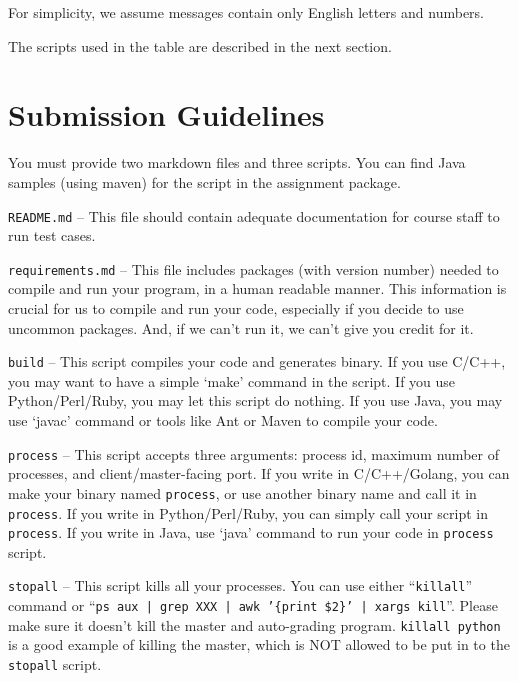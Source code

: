 \documentclass[11pt]{article}
\begin{document}
    For simplicity, we assume messages contain only English letters and numbers.

    The scripts used in the table are described in the next section.

    \section{Submission Guidelines}\label{sec:submissionGuidelines}
    \begin{compactitem}
        \item You must provide two markdown files and three scripts.
        You can find Java samples (using maven) for the script in the assignment package.
        \begin{compactitem}
            \item \texttt{README.md} -- This file should contain adequate documentation for course staff to run test cases.

            \item \texttt{requirements.md} -- This file includes packages (with version number) needed to compile and run your program, in a human readable manner.
            This information is crucial for us to compile and run your code, especially if you decide to use uncommon packages.
            And, if we can't run it, we can't give you credit for it.

            \item \texttt{build} -- This script compiles your code and generates binary.
            If you use C/C++, you may want to have a simple `make' command in the script.
            If you use Python/Perl/Ruby, you may let this script do nothing.
            If you use Java, you may use `javac' command or tools like Ant or Maven to compile your code.

            \item \texttt{process} -- This script accepts three arguments: process id, maximum number of processes, and client/master-facing port.
            If you write in C/C++/Golang, you can make your binary named \texttt{process}, or use another binary name and call it in \texttt{process}.
            If you write in Python/Perl/Ruby, you can simply call your script in \texttt{process}.
            If you write in Java, use `java' command to run your code in \texttt{process} script.

            \item \texttt{stopall} -- This script kills all your processes.
            You can use either ``\texttt{killall}'' command or ``\texttt{ps aux | grep XXX | awk '\{print \$2\}' | xargs kill}''.
            Please make sure it doesn't kill the master and auto-grading program.
            \texttt{killall python} is a good example of killing the master, which is NOT allowed to be put in to the \texttt{stopall} script.


\end{compactitem}
\end{compactitem}
\end{document}
